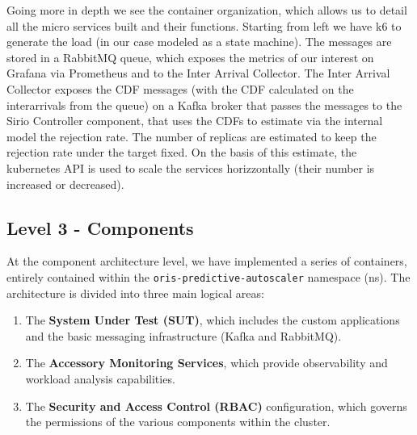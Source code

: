 Going more in depth we see the container organization, which allows us to detail all the micro services built and their functions. Starting from left we have k6 to generate the load (in our case modeled as a state machine). The messages are stored in a RabbitMQ queue, which exposes the metrics of our interest on Grafana via Prometheus and to the Inter Arrival Collector. The Inter Arrival Collector exposes the CDF messages (with the CDF calculated on the interarrivals from the queue) on a Kafka broker that passes the messages to the Sirio Controller component, that uses the CDFs to estimate via the internal model the rejection rate. The number of replicas are estimated to keep the rejection rate under the target fixed. On the basis of this estimate, the kubernetes API is used to scale the services horizzontally (their number is increased or decreased).


\subsection{Level 3 - Components}
At the component architecture level, we have implemented a series of containers, entirely contained within the \verb|oris-predictive-autoscaler| namespace (ns). The architecture is divided into three main logical areas:
\begin{enumerate}
    \item The \textbf{System Under Test (SUT)}, which includes the custom applications and the basic messaging infrastructure (Kafka and RabbitMQ).
    \item The \textbf{Accessory Monitoring Services}, which provide observability and workload analysis capabilities.
    \item The \textbf{Security and Access Control (RBAC)} configuration, which governs the permissions of the various components within the cluster.
\end{enumerate}

